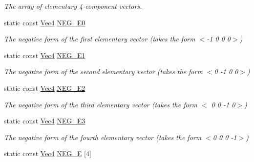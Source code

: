 \begin{DoxyCompactItemize}
\begin{DoxyCompactList}\small\item\em The array of elementary 4-\/component vectors. \end{DoxyCompactList}\item 
\hypertarget{structgfxmath_1_1_vec4_a53b82498b3cd56013b5d6c3844887762}{}static const \hyperlink{structgfxmath_1_1_vec4}{Vec4} \hyperlink{structgfxmath_1_1_vec4_a53b82498b3cd56013b5d6c3844887762}{N\+E\+G\+\_\+\+E0}\label{structgfxmath_1_1_vec4_a53b82498b3cd56013b5d6c3844887762}

\begin{DoxyCompactList}\small\item\em The negative form of the first elementary vector (takes the form $<$-\/1 0 0 0$>$) \end{DoxyCompactList}\item 
\hypertarget{structgfxmath_1_1_vec4_a031568f305d117ba88e7304bea12e505}{}static const \hyperlink{structgfxmath_1_1_vec4}{Vec4} \hyperlink{structgfxmath_1_1_vec4_a031568f305d117ba88e7304bea12e505}{N\+E\+G\+\_\+\+E1}\label{structgfxmath_1_1_vec4_a031568f305d117ba88e7304bea12e505}

\begin{DoxyCompactList}\small\item\em The negative form of the second elementary vector (takes the form $<$0 -\/1 0 0$>$) \end{DoxyCompactList}\item 
\hypertarget{structgfxmath_1_1_vec4_a0bb4824329e79246c0489fb2e8f47a0d}{}static const \hyperlink{structgfxmath_1_1_vec4}{Vec4} \hyperlink{structgfxmath_1_1_vec4_a0bb4824329e79246c0489fb2e8f47a0d}{N\+E\+G\+\_\+\+E2}\label{structgfxmath_1_1_vec4_a0bb4824329e79246c0489fb2e8f47a0d}

\begin{DoxyCompactList}\small\item\em The negative form of the third elementary vector (takes the form $<$ 0 0 -\/1 0$>$) \end{DoxyCompactList}\item 
\hypertarget{structgfxmath_1_1_vec4_a32b83e6413346bc53270f26742196700}{}static const \hyperlink{structgfxmath_1_1_vec4}{Vec4} \hyperlink{structgfxmath_1_1_vec4_a32b83e6413346bc53270f26742196700}{N\+E\+G\+\_\+\+E3}\label{structgfxmath_1_1_vec4_a32b83e6413346bc53270f26742196700}

\begin{DoxyCompactList}\small\item\em The negative form of the fourth elementary vector (takes the form $<$0 0 0 -\/1$>$) \end{DoxyCompactList}\item 
\hypertarget{structgfxmath_1_1_vec4_ae7d194fe94f7bf6aacb24a0e9f9571c2}{}static const \hyperlink{structgfxmath_1_1_vec4}{Vec4} \hyperlink{structgfxmath_1_1_vec4_ae7d194fe94f7bf6aacb24a0e9f9571c2}{N\+E\+G\+\_\+\+E} \mbox{[}4\mbox{]}\label{structgfxmath_1_1_vec4_ae7d194fe94f7bf6aacb24a0e9f9571c2}


\end{DoxyCompactItemize}

